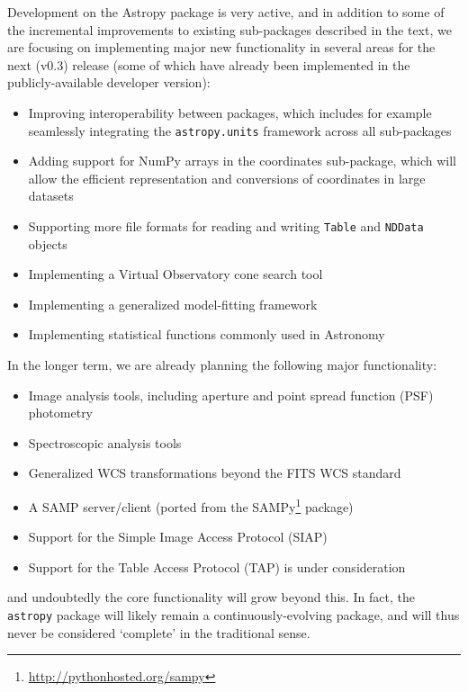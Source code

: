 \documentclass[traditabstract]{aa}
\newcommand{\astropy}{\texttt{astropy}\xspace}
\begin{document}
\label{sec:future}

Development on the Astropy package is very active, and in addition to
some of the incremental improvements to existing sub-packages described in the
text, we are focusing on implementing major new functionality in
several areas for the next (v0.3) release (some of which have already been
implemented in the publicly-available developer version):

\begin{itemize}
\item Improving interoperability between packages, which includes for example seamlessly integrating the \texttt{astropy.units} framework across all sub-packages
\item Adding support for NumPy arrays in the coordinates sub-package, which will allow the efficient representation and conversions of coordinates in large datasets
\item Supporting more file formats for reading and writing \texttt{Table} and \texttt{NDData} objects
\item Implementing a Virtual Observatory cone search tool \citep{vo-cone-search}
\item Implementing a generalized model-fitting framework
\item Implementing statistical functions commonly used in Astronomy
\end{itemize}

In the longer term, we are already planning the following major functionality:

\begin{itemize}
\item Image analysis tools, including aperture and point spread function (PSF) photometry
\item Spectroscopic analysis tools
\item Generalized WCS transformations beyond the FITS WCS standard
\item A SAMP server/client (ported from the SAMPy\footnote{\url{http://pythonhosted.org/sampy}} package)
\item Support for the Simple Image Access Protocol (SIAP) \citep{vo-siap}
\item Support for the Table Access Protocol (TAP) \citep{vo-tap} is under consideration
\end{itemize}

\noindent and undoubtedly the core functionality will grow beyond this. In
fact, the \astropy package will likely remain a continuously-evolving package,
and will thus never be considered `complete' in the traditional sense.
\end{document}
